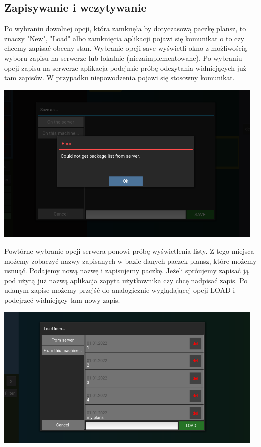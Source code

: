 \documentclass[a4paper,11pt]{article}
\begin{document}
\subsection{Zapisywanie i wczytywanie}

Po wybraniu dowolnej opcji, która zamknęła by dotyczasową paczkę plansz, to znaczy "New", "Load" albo zamknięcia aplikacji pojawi się komunikat o to czy chcemy zapisać obecny stan. Wybranie opcji save wyświetli okno z możliwością wyboru zapisu na serwerze lub lokalnie (niezaimplementowane). Po wybraniu opcji zapisu na serwerze aplikacja podejmie próbę odczytania widniejących już tam zapisów. W przypadku niepowodzenia pojawi się stosowny komunikat.

\begin{center}
    \includegraphics[width=13cm]{img/unsuccessfulsave.png}
\end{center}

Powtórne wybranie opcji serwera ponowi próbę wyświetlenia listy. Z tego miejsca możemy zobaczyć nazwy zapisanych w bazie danych paczek plansz, które możemy usnuąć. Podajemy nową nazwę i zapisujemy paczkę. Jeżeli spróujemy zapisać ją pod użytą już nazwą aplikacja zapyta użytkownika czy chcę nadpisać zapis. Po udanym zapise możemy przejść do analogicznie wyglądającej opcji LOAD i podejrzeć widniejący tam nowy zapis.

\begin{center}
    \includegraphics[width=13cm]{img/load.png}
\end{center}
\end{document}
